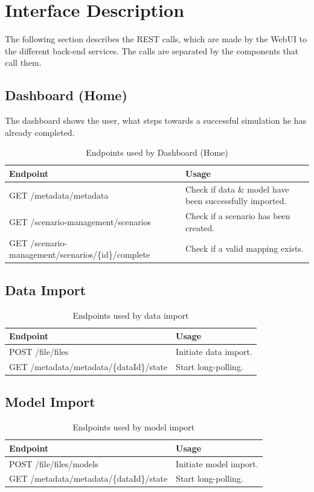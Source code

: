 \section{Interface Description}
The following section describes the REST calls, which are made by the WebUI to the different back-end services. The calls are separated by the components that call them.


\subsection{Dashboard (Home)}
The dashboard shows the user, what steps towards a successful simulation he has already completed.
\begin{table}[H]
	\caption{Endpoints used by Dashboard (Home)}
	\begin{tabularx}{\textwidth}{|l|X|}
		\hline
		\textbf{Endpoint} & \textbf{Usage} \\ \hline
		GET /metadata/metadata & Check if data \& model have been successfully imported. \\ \hline
		GET /scenario-management/scenarios & Check if a scenario has been created.\\ \hline
		GET /scenario-management/scenarios/\{id\}/complete & Check if a valid mapping exists.\\ \hline
	\end{tabularx}
\end{table}


\subsection{Data Import}
\begin{table}[H]
	\caption{Endpoints used by data import}
	\begin{tabularx}{\textwidth}{|l|X|}
		\hline
		\textbf{Endpoint} & \textbf{Usage} \\ \hline
		POST /file/files & Initiate data import.\\ \hline
		GET /metadata/metadata/\{dataId\}/state & Start long-polling. \\ \hline
	\end{tabularx}
\end{table}


\subsection{Model Import}
\begin{table}[H]
	\caption{Endpoints used by model import}
	\begin{tabularx}{\textwidth}{|l|X|}
		\hline
		\textbf{Endpoint} & \textbf{Usage} \\ \hline
		POST /file/files/models & Initiate model import. \\ \hline
		GET /metadata/metadata/\{dataId\}/state & Start long-polling. \\ \hline
	\end{tabularx}
\end{table}


